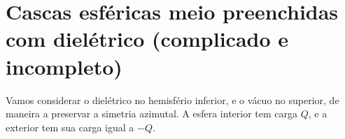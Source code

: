\documentclass{article}
\begin{document}
\section{Cascas esféricas meio preenchidas com dielétrico (complicado e incompleto)}
Vamos considerar o dielétrico no hemisfério inferior, e o vácuo no superior, de maneira a preservar a simetria azimutal. A esfera interior tem carga $Q$, e a exterior
tem sua carga igual a $-Q$.
\end{document}
